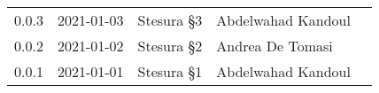 {\begin{longtable}{ c c  C{3.5cm}  C{4cm}  c }
        0.0.3                  & 2021-01-03                                       & Stesura §3                                   & Abdelwahad Kandoul & \verificatore{} \\
        0.0.2                  & 2021-01-02                                       & Stesura §2                                   & Andrea De Tomasi & \verificatore{} \\
        0.0.1                  & 2021-01-01                                       & Stesura §1                                   & Abdelwahad Kandoul & \verificatore{} \\
    
    
    \end{longtable}
}
